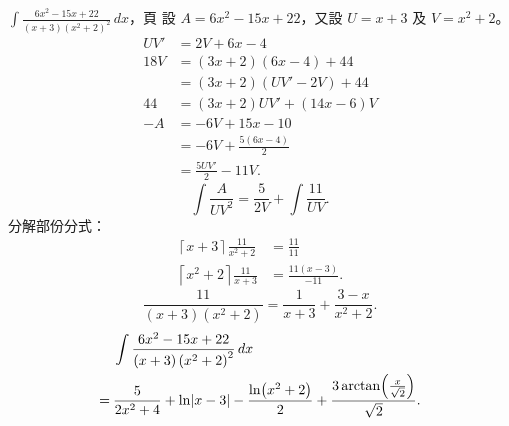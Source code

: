 \documentclass{beamer}
\newcommand{\Left} {\mathopen{}\mathclose\bgroup\left}
\newcommand{\Right}{\aftergroup\egroup\right}
\theoremstyle{remark}
\begin{document}
\begin{CJK}{UTF8}{bsmi}
\begin{frame}[allowframebreaks]{$\displaystyle \int \frac{6x^2 - 15x + 22}{(x+3) \left( x^2 + 2 \right)^2}\,dx$，頁}
  設 $A = 6x^2 - 15x + 22$，又設 $U = x+3$ 及 $V = x^2 + 2$。
  \begin{align*}
    UV' &= 2V + 6x - 4\\
    18V &= (3x + 2) \left( 6x - 4 \right) + 44\\
	&= (3x + 2) \left( UV' - 2V \right) + 44\\
    44  &= \left( 3x + 2 \right) UV' + \left( 14x - 6 \right) V\\
    -A  &= -6V + 15x - 10\\
	&= -6V + \frac{5 \left( 6x - 4 \right)}{2}\\
	&= \frac{5UV'}{2} - 11V.
  \end{align*}
  \[\int \frac{A}{UV^2} = \frac{5}{2V} + \int \frac{11}{UV}.\]
  分解部份分式：
  \begin{align*}
    \left\lceil x + 3 \right\rceil   \frac{11}{x^2 + 2} &= \frac{11}{11}\\
    \left\lceil x^2 + 2 \right\rceil \frac{11}{x   + 3} &= \frac{11 \left( x-3 \right)}{-11}.
  \end{align*}
  \[\frac{11}{(x+3) \left( x^2 + 2 \right)} = \frac{1}{x+3} + \frac{3-x}{x^2 + 2}.\]
  \begin{align*}
       & \int \frac{6x^2 - 15x + 22}{(x+3) \left( x^2 + 2 \right)^2}\,dx\\
    =\:& \frac{5}{2x^2 + 4} + \ln \Left| x-3 \Right| - \frac{\ln \Left( x^2 + 2 \Right)}{2}
	 +\frac{3 \arctan \Left( \frac{x}{\sqrt2} \Right)}{\sqrt2}.
  \end{align*}
\end{frame}


\end{CJK}
\end{document}
